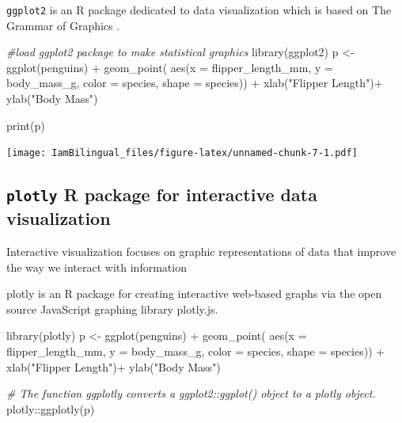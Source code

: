 \documentclass[
]{book}
\newenvironment{Shaded}{\begin{snugshade}}{\end{snugshade}}
\newcommand{\AttributeTok}[1]{\textcolor[rgb]{0.77,0.63,0.00}{#1}}
\newcommand{\CommentTok}[1]{\textcolor[rgb]{0.56,0.35,0.01}{\textit{#1}}}
\newcommand{\FunctionTok}[1]{\textcolor[rgb]{0.00,0.00,0.00}{#1}}
\newcommand{\NormalTok}[1]{#1}
\newcommand{\OtherTok}[1]{\textcolor[rgb]{0.56,0.35,0.01}{#1}}
\newcommand{\SpecialCharTok}[1]{\textcolor[rgb]{0.00,0.00,0.00}{#1}}
\newcommand{\StringTok}[1]{\textcolor[rgb]{0.31,0.60,0.02}{#1}}
\begin{document}
\texttt{ggplot2} is an R package dedicated to data visualization which is based on The Grammar of Graphics \citep{wilkinson2012grammar}.

\begin{Shaded}
\begin{Highlighting}[]
\CommentTok{\#load ggplot2 package to make statistical graphics}
\FunctionTok{library}\NormalTok{(ggplot2)}
\NormalTok{p }\OtherTok{\textless{}{-}} \FunctionTok{ggplot}\NormalTok{(penguins) }\SpecialCharTok{+}
  \FunctionTok{geom\_point}\NormalTok{( }\FunctionTok{aes}\NormalTok{(}\AttributeTok{x =}\NormalTok{ flipper\_length\_mm,}
                  \AttributeTok{y =}\NormalTok{ body\_mass\_g,}
                  \AttributeTok{color =}\NormalTok{ species,}
                  \AttributeTok{shape =}\NormalTok{ species)) }\SpecialCharTok{+}
  \FunctionTok{xlab}\NormalTok{(}\StringTok{"Flipper Length"}\NormalTok{)}\SpecialCharTok{+}
  \FunctionTok{ylab}\NormalTok{(}\StringTok{"Body Mass"}\NormalTok{)}

\FunctionTok{print}\NormalTok{(p)}
\end{Highlighting}
\end{Shaded}

\texttt{[image: IamBilingual\_files/figure-latex/unnamed-chunk-7-1.pdf]}

\hypertarget{plotly-r-package-for-interactive-data-visualization}{%
\subsection{\texorpdfstring{\texttt{plotly} R package for interactive data visualization}{plotly R package for interactive data visualization}}\label{plotly-r-package-for-interactive-data-visualization}}

Interactive visualization focuses on graphic representations of data that improve the way we interact with information

plotly is an R package for creating interactive web-based graphs via the open source JavaScript graphing library plotly.js.

\begin{Shaded}
\begin{Highlighting}[]
\FunctionTok{library}\NormalTok{(plotly)}
\NormalTok{p }\OtherTok{\textless{}{-}} \FunctionTok{ggplot}\NormalTok{(penguins) }\SpecialCharTok{+}
  \FunctionTok{geom\_point}\NormalTok{( }\FunctionTok{aes}\NormalTok{(}\AttributeTok{x =}\NormalTok{ flipper\_length\_mm,}
                  \AttributeTok{y =}\NormalTok{ body\_mass\_g,}
                  \AttributeTok{color =}\NormalTok{ species,}
                  \AttributeTok{shape =}\NormalTok{ species)) }\SpecialCharTok{+}
  \FunctionTok{xlab}\NormalTok{(}\StringTok{"Flipper Length"}\NormalTok{)}\SpecialCharTok{+}
  \FunctionTok{ylab}\NormalTok{(}\StringTok{"Body Mass"}\NormalTok{)}

\CommentTok{\# The function ggplotly converts a ggplot2::ggplot() object to a plotly object.}
\NormalTok{plotly}\SpecialCharTok{::}\FunctionTok{ggplotly}\NormalTok{(p)}
\end{Highlighting}
\end{Shaded}
\end{document}
